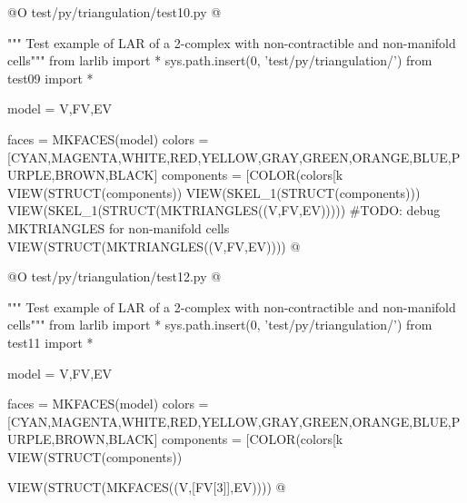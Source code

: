 \documentclass[11pt,oneside]{article}    %
\begin{document}
@O test/py/triangulation/test10.py
@{""" Test example of LAR of a 2-complex with non-contractible and non-manifold cells"""
from larlib import *
sys.path.insert(0, 'test/py/triangulation/')
from test09 import *

model = V,FV,EV

faces = MKFACES(model)
colors = [CYAN,MAGENTA,WHITE,RED,YELLOW,GRAY,GREEN,ORANGE,BLUE,PURPLE,BROWN,BLACK]
components = [COLOR(colors[k%
VIEW(STRUCT(components))
VIEW(SKEL_1(STRUCT(components)))
VIEW(SKEL_1(STRUCT(MKTRIANGLES((V,FV,EV)))))  #TODO: debug MKTRIANGLES for non-manifold cells
VIEW(STRUCT(MKTRIANGLES((V,FV,EV))))
@}
@O test/py/triangulation/test12.py
@{""" Test example of LAR of a 2-complex with non-contractible and non-manifold cells"""
from larlib import *
sys.path.insert(0, 'test/py/triangulation/')
from test11 import *

model = V,FV,EV

faces = MKFACES(model)
colors = [CYAN,MAGENTA,WHITE,RED,YELLOW,GRAY,GREEN,ORANGE,BLUE,PURPLE,BROWN,BLACK]
components = [COLOR(colors[k%
VIEW(STRUCT(components))

VIEW(STRUCT(MKFACES((V,[FV[3]],EV))))
@}
\end{document}
